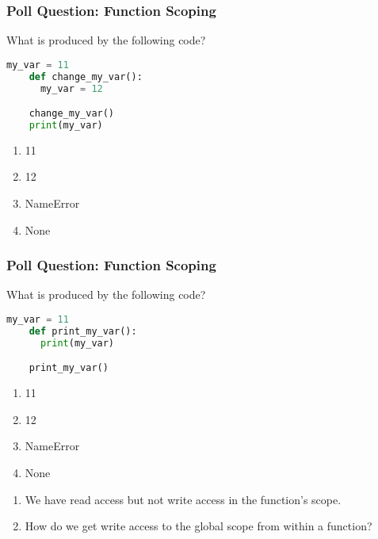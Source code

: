 \documentclass{beamer}
\begin{document}
%
%
%
\begin{frame}[fragile]
  \frametitle{Poll Question: Function Scoping}
  \begin{minipage}{0.69\textwidth}
    What is produced by the following code?
    \begin{lstlisting}[language=Python, autogobble]
    my_var = 11
    def change_my_var():
      my_var = 12

    change_my_var()
    print(my_var)
    \end{lstlisting}
  \end{minipage}
  \hfill
  \begin{minipage}{0.29\textwidth}
    \begin{enumerate}[A]
      \item 11
      \item 12
      \item NameError
      \item None
    \end{enumerate}
  \end{minipage}
\end{frame}

%
%
%
\begin{frame}[fragile]
  \frametitle{Poll Question: Function Scoping}
  \begin{minipage}{0.69\textwidth}
    What is produced by the following code?
    \begin{lstlisting}[language=Python, autogobble]
    my_var = 11
    def print_my_var():
      print(my_var)

    print_my_var()
    \end{lstlisting}
  \end{minipage}
  \hfill
  \begin{minipage}{0.29\textwidth}
    \begin{enumerate}[A]
      \item 11
      \item 12
      \item NameError
      \item None
    \end{enumerate}
  \end{minipage}
  \pause
  \vfill
  \begin{enumerate}
    \item We have read access but not write access in the function's scope. 
    \item How do we get write access to the global scope from within a function?
  \end{enumerate}
\end{frame}
\end{document}
